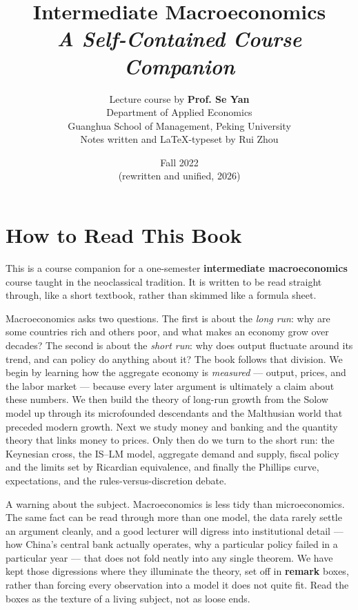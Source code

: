 \documentclass[oneside]{book}
\def\notetitle{Intermediate Macroeconomics}
\def\notesubtitle{A Self-Contained Course Companion}
\def\noteauthor{Lecture course by \textbf{Prof. Se Yan} \\
    Department of Applied Economics \\
    Guanghua School of Management, Peking University \\
    \vspace{0.5em}
    Notes written and {\LaTeX}-typeset by Rui Zhou}
\def\notedate{Fall 2022 \\ \small (rewritten and unified, 2026)}
\begin{document}
\title{\textbf{
    \LARGE{\notetitle}\\
    \vspace{0.5em}
    \large\textit{\notesubtitle}
    \vspace*{8\baselineskip}}
}
\author{\noteauthor}
\date{\notedate}

\maketitle
\newpage

\thispagestyle{empty}
\section*{How to Read This Book}

This is a course companion for a one-semester \textbf{intermediate macroeconomics} course taught in the neoclassical tradition. It is written to be read straight through, like a short textbook, rather than skimmed like a formula sheet.

Macroeconomics asks two questions. The first is about the \emph{long run}: why are some countries rich and others poor, and what makes an economy grow over decades? The second is about the \emph{short run}: why does output fluctuate around its trend, and can policy do anything about it? The book follows that division. We begin by learning how the aggregate economy is \emph{measured} --- output, prices, and the labor market --- because every later argument is ultimately a claim about these numbers. We then build the theory of long-run growth from the Solow model up through its microfounded descendants and the Malthusian world that preceded modern growth. Next we study money and banking and the quantity theory that links money to prices. Only then do we turn to the short run: the Keynesian cross, the IS--LM model, aggregate demand and supply, fiscal policy and the limits set by Ricardian equivalence, and finally the Phillips curve, expectations, and the rules-versus-discretion debate.

A warning about the subject. Macroeconomics is less tidy than microeconomics. The same fact can be read through more than one model, the data rarely settle an argument cleanly, and a good lecturer will digress into institutional detail --- how China's central bank actually operates, why a particular policy failed in a particular year --- that does not fold neatly into any single theorem. We have kept those digressions where they illuminate the theory, set off in \textbf{remark} boxes, rather than forcing every observation into a model it does not quite fit. Read the boxes as the texture of a living subject, not as loose ends.
\end{document}
